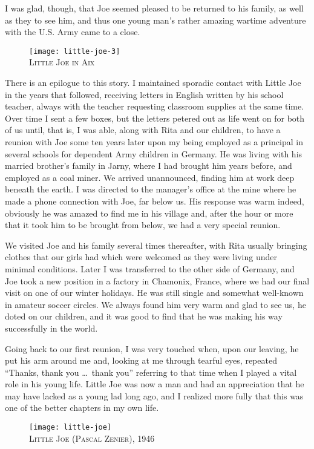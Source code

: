 \documentclass[../m3y]{subfiles}
\begin{document}
I was glad, though, that Joe seemed pleased to be returned to his family, as well as they to see him, and thus one young man's rather amazing wartime adventure with the U.S. Army came to a close.

\begin{figure}[h]
\centering
\texttt{[image: little-joe-3]}\\
\medskip
{\newtimes\textsc{Little Joe in Aix}}
\end{figure}
There is an epilogue to this story. I maintained sporadic contact with Little Joe in the years that followed, receiving letters in English written by his school teacher, always with the teacher requesting classroom supplies at the same time. Over time I sent a few boxes, but the letters petered out as life went on for both of us until, that is, I was able, along with Rita and our children, to have a reunion with Joe some ten years later upon my being employed as a principal in several schools for dependent Army children in Germany. He was living with his married brother's family in Jarny, where I had brought him years before, and employed as a coal miner. We arrived unannounced, finding him at work deep beneath the earth. I was directed to the manager's office at the mine where he made a phone connection with Joe, far below us. His response was warm indeed, obviously he was amazed to find me in his village and, after the hour or more that it took him to be brought from below, we had a very special reunion.

We visited Joe and his family several times thereafter, with Rita usually bringing clothes that our girls had which were welcomed as they were living under minimal conditions. Later I was transferred to the other side of Germany, and Joe took a new position in a factory in Chamonix, France, where we had our final visit on one of our winter holidays. He was still single and somewhat well-known in amateur soccer circles. We always found him very warm and glad to see us, he doted on our children, and it was good to find that he was making his way successfully in the world.

Going back to our first reunion, I was very touched when, upon our leaving, he put his arm around me and, looking at me through tearful eyes, repeated ``Thanks, thank you \ldots\ thank you'' referring to that time when I played a vital role in his young life. Little Joe was now a man and had an appreciation that he may have lacked as a young lad long ago, and I realized more fully that this was one of the better chapters in my own life.

\begin{figure}[h]
\centering
\texttt{[image: little-joe]}\\
\medskip
{\newtimes\textsc{Little Joe (Pascal Zenier), 1946}}
\end{figure}
\end{document}
